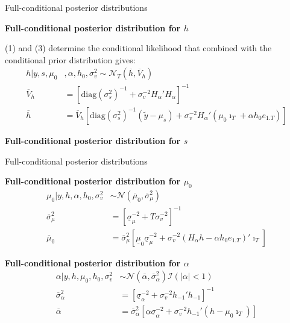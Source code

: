 \documentclass[notes,blackandwhite,mathsans,usenames,dvipsnames]{beamer}
\begin{document}
\begin{frame}{Full-conditional posterior distributions}

\textbf{Full-conditional posterior distribution for $h$}

 (1) {\color{mcxs2}and} (3) {\color{mcxs2}determine the conditional likelihood that combined with the conditional prior distribution gives:}
\begin{align*}
h| y,s,\mu_0&,\alpha,h_0,\sigma_v^2 \sim\mathcal{N}_T\left(\overline{h},\overline{V}_h  \right)\\
\overline{V}_h &= \left[ \text{diag}\left(  \sigma_s^2\right)^{-1} + \sigma_v^{-2}H_\alpha'H_\alpha \right]^{-1} \\
\overline{h} &= \overline{V}_h\left[ \text{diag}\left(  \sigma_s^2\right)^{-1}\left( \tilde{y} - \mu_s \right) + \sigma_v^{-2} H_\alpha'\left(\mu_0\imath_T + \alpha h_0e_{1.T}\right)\right]
\end{align*}

\bigskip\textbf{Full-conditional posterior distribution for $s$}


\end{frame}






\begin{frame}{Full-conditional posterior distributions}

\textbf{Full-conditional posterior distribution for $\mu_0$}
\begin{align*}
\mu_0| y,h,\alpha,h_0,\sigma_v^2 &\sim\mathcal{N}\left(\overline{\mu}_0,\overline{\sigma}_\mu^2  \right)\\
\overline{\sigma}_\mu^2 &= \left[ \underline\sigma_\mu^{-2} + T\sigma_v^{-2} \right]^{-1} \\
\overline{\mu}_0 &= \overline{\sigma}_\mu^2\left[ \underline{\mu}_0\underline\sigma_\mu^{-2} +  \sigma_v^{-2} \left(H_\alpha h- \alpha h_0e_{1.T}\right)'\imath_T\right]
\end{align*}

\bigskip\textbf{Full-conditional posterior distribution for $\alpha$}
\begin{align*}
\alpha| y,h,\mu_0,h_0,\sigma_v^2 &\sim\mathcal{N}\left(\overline{\alpha},\overline{\sigma}_\alpha^2  \right)\mathcal{I}(|\alpha|<1)\\
\overline{\sigma}_\alpha^2 &= \left[ \underline\sigma_\alpha^{-2} + \sigma_v^{-2}h_{-1}'h_{-1} \right]^{-1} \\
\overline{\alpha} &= \overline{\sigma}_\alpha^2\left[ \underline{\alpha} \underline\sigma_\alpha^{-2} + \sigma_v^{-2} h_{-1}'\left( h- \mu_0\imath_T\right)\right]
\end{align*}

\end{frame}
\end{document}
